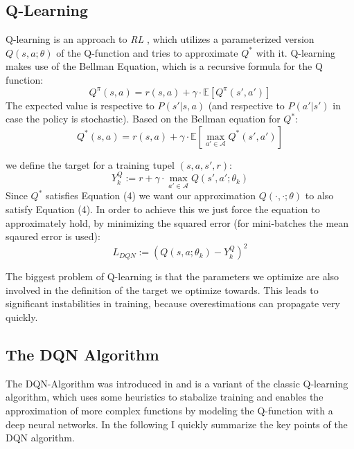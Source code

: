 \documentclass{article}
\newcommand{\RL}{\emph{RL} }
\begin{document}
\subsection{Q-Learning}
\label{Q-learning}
Q-learning is an approach to \RL, which utilizes a parameterized version $Q(s,a;\theta)$ of the Q-function and tries to approximate $Q^*$ with it. Q-learning makes use of the Bellman Equation, which is a recursive formula for the Q function: 
\begin{equation}
		 Q^{\pi}(s,a) = r(s,a) + \gamma \cdot  \mathbb{E}\left[ Q^{\pi}(s',a') \right]
\end{equation}
The expected value is respective to $P(s' | s, a) $ (and respective to $P(a' | s')$ in case the policy is stochastic).
Based on the Bellman equation for $Q^*$: 
\begin{equation}
 Q^{*}(s,a) = r(s,a) + \gamma \cdot \mathbb{E}\left[ \max_{a' \in \mathcal{A}}Q^{*}(s',a') \right]
\end{equation}

we define the target  for a training tupel $(s,a,s',r)$: 
\begin{equation}
Y_k^Q := r + \gamma \cdot \max_{a' \in \mathcal{A}}Q(s',a';\theta_k)
\end{equation}
Since $Q^*$ satisfies Equation (4)
we want our approximation $Q(\cdot,\cdot;\theta)$ to also satisfy Equation (4).
In order to achieve this we just force the equation to approximately hold, by minimizing the squared error (for mini-batches the mean sqaured error is used):
\begin{equation}
	L_{DQN} := \left(  Q(s,a;\theta_k) - Y_k^Q  \right)^2
\end{equation}

The biggest problem of Q-learning is that the parameters we optimize are also involved in the definition of the target we optimize towards. This leads to significant instabilities in training, because overestimations can propagate very quickly.

\subsection{The DQN Algorithm}
\label{dqnAlgorithm}
The DQN-Algorithm was introduced in \cite{atari} and is a variant of the classic Q-learning algorithm, which uses some heuristics to stabalize training and enables the approximation of more complex functions by modeling the Q-function with a deep neural networks. In the following I quickly summarize the key points of the DQN algorithm. \\
\end{document}
